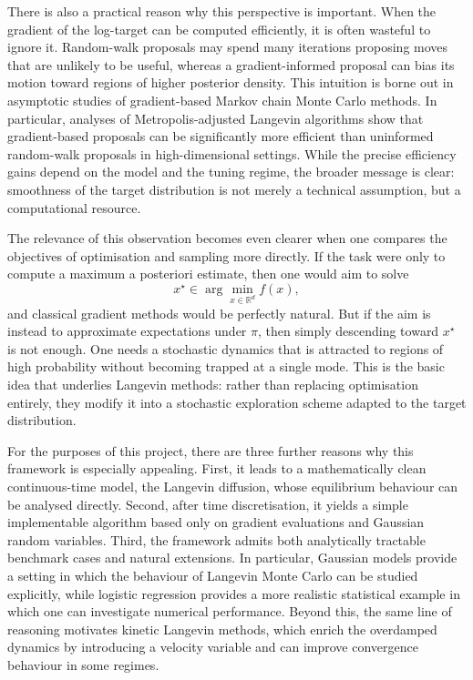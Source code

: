 \documentclass[a4paper,11pt, titlepage]{article}
\theoremstyle{definition}
\theoremstyle{plain}
\theoremstyle{remark}
\begin{document}
There is also a practical reason why this perspective is important. When the gradient of the log-target can be computed efficiently, it is often wasteful to ignore it. Random-walk proposals may spend many iterations proposing moves that are unlikely to be useful, whereas a gradient-informed proposal can bias its motion toward regions of higher posterior density. This intuition is borne out in asymptotic studies of gradient-based Markov chain Monte Carlo methods. In particular, analyses of Metropolis-adjusted Langevin algorithms show that gradient-based proposals can be significantly more efficient than uninformed random-walk proposals in high-dimensional settings. While the precise efficiency gains depend on the model and the tuning regime, the broader message is clear: smoothness of the target distribution is not merely a technical assumption, but a computational resource.

The relevance of this observation becomes even clearer when one compares the objectives of optimisation and sampling more directly. If the task were only to compute a maximum a posteriori estimate, then one would aim to solve
\[
x^\star \in \arg\min_{x\in\mathbb{R}^d} f(x),
\]
and classical gradient methods would be perfectly natural. But if the aim is instead to approximate expectations under $\pi$, then simply descending toward $x^\star$ is not enough. One needs a stochastic dynamics that is attracted to regions of high probability without becoming trapped at a single mode. This is the basic idea that underlies Langevin methods: rather than replacing optimisation entirely, they modify it into a stochastic exploration scheme adapted to the target distribution.

For the purposes of this project, there are three further reasons why this framework is especially appealing. First, it leads to a mathematically clean continuous-time model, the Langevin diffusion, whose equilibrium behaviour can be analysed directly. Second, after time discretisation, it yields a simple implementable algorithm based only on gradient evaluations and Gaussian random variables. Third, the framework admits both analytically tractable benchmark cases and natural extensions. In particular, Gaussian models provide a setting in which the behaviour of Langevin Monte Carlo can be studied explicitly, while logistic regression provides a more realistic statistical example in which one can investigate numerical performance. Beyond this, the same line of reasoning motivates kinetic Langevin methods, which enrich the overdamped dynamics by introducing a velocity variable and can improve convergence behaviour in some regimes.
\end{document}
